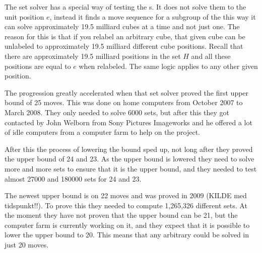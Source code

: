 The set solver has a special way of testing the \rubik{}s. It does not solve them to the unit position $e$, instead it finds a move sequence for a subgroup of the \rubik{} this way it can solve approximately 19.5 milliard cubes at a time and not just one. The reason for this is that if you relabel an arbitrary cube, that given cube can be unlabeled to approximately 19.5 milliard different cube positions. Recall that there are approximately 19.5 milliard positions in the set $H$ and all these positions are equal to $e$ when relabeled. The same logic applies to any other given position.

The progression greatly accelerated when that set solver proved the first upper bound of 25 moves. This was done on home computers from October 2007 to March 2008. They only needed to solve 6000 sets, but after this they got contacted by John Welborn from Sony Pictures Imageworks and he offered a lot of idle computers from a computer farm to help on the project. 

After this the process of lowering the bound sped up, not long after they proved the upper bound of 24 and 23. As the upper bound is lowered they need to solve more and more sets to ensure that it is the upper bound, and they needed to test almost 27000 and 180000 sets for 24 and 23. 

The newest upper bound is on 22 moves and was proved in 2009 (KILDE med tidspunkt!!). To prove this they needed to compute 1,265,326 different sets. At the moment they have not proven that the upper bound can be 21, but the computer farm is currently working on it, and they expect that it is possible to lower the upper bound to 20. This means that any arbitrary \rubik{} could be solved in just 20 moves.
